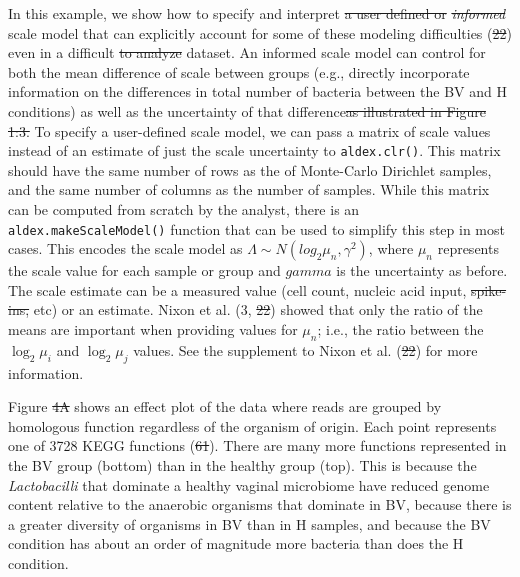 \documentclass[
]{article}
\providecommand{\DIFadd}[1]{{\protect\color{blue}\uwave{#1}}} %
\providecommand{\DIFdel}[1]{{\protect\color{red}\sout{#1}}}                      %
\providecommand{\DIFaddbegin}{} %
\providecommand{\DIFaddend}{} %
\providecommand{\DIFdelbegin}{} %
\providecommand{\DIFdelend}{} %
\newcommand{\DIFscaledelfig}{0.5}
\newlength{\DIFdelgraphicswidth} %
\newlength{\DIFdelgraphicsheight} %
\newcommand{\DIFaddincludegraphics}[2][]{{\color{blue}\fbox{\DIFOincludegraphics[#1]{#2}}}} %
\newcommand{\DIFdelincludegraphics}[2][]{%
\sbox{\DIFdelgraphicsbox}{\DIFOincludegraphics[#1]{#2}}%
\settoboxwidth{\DIFdelgraphicswidth}{\DIFdelgraphicsbox} %
\settoboxtotalheight{\DIFdelgraphicsheight}{\DIFdelgraphicsbox} %
\scalebox{\DIFscaledelfig}{%
\parbox[b]{\DIFdelgraphicswidth}{\usebox{\DIFdelgraphicsbox}\\[-\baselineskip] \rule{\DIFdelgraphicswidth}{0em}}\llap{\resizebox{\DIFdelgraphicswidth}{\DIFdelgraphicsheight}{%
\setlength{\unitlength}{\DIFdelgraphicswidth}%
\begin{picture}(1,1)%
\thicklines\linethickness{2pt} %
{\color[rgb]{1,0,0}\put(0,0){\framebox(1,1){}}}%
{\color[rgb]{1,0,0}\put(0,0){\line( 1,1){1}}}%
{\color[rgb]{1,0,0}\put(0,1){\line(1,-1){1}}}%
\end{picture}%
}\hspace*{3pt}}} %
} %
\DeclareRobustCommand{\DIFaddbegin}{\DIFOaddbegin \let\includegraphics\DIFaddincludegraphics} %
\DeclareRobustCommand{\DIFaddend}{\DIFOaddend \let\includegraphics\DIFOincludegraphics} %
\DeclareRobustCommand{\DIFdelbegin}{\DIFOdelbegin \let\includegraphics\DIFdelincludegraphics} %
\DeclareRobustCommand{\DIFdelend}{\DIFOaddend \let\includegraphics\DIFOincludegraphics} %
\begin{document}
\DIFdelend In this example, we show how to specify and interpret \DIFdelbegin \DIFdel{a user defined or
}\emph{\DIFdel{informed}} %
\DIFdelend \DIFaddbegin \DIFadd{an informed }\DIFaddend scale
model that can explicitly account for some of these modeling
difficulties (\DIFdelbegin \DIFdel{22}\DIFdelend \DIFaddbegin \DIFadd{20}\DIFaddend ) even in a difficult \DIFdelbegin \DIFdel{to analyze }\DIFdelend dataset. An informed scale model
can control for both the mean difference of scale between groups (e.g.,
directly incorporate information on the differences in total number of
bacteria between the BV and H conditions) as well as the uncertainty of
that difference\DIFdelbegin \DIFdel{as illustrated in Figure
1:3. }\DIFdelend \DIFaddbegin \DIFadd{. }\DIFaddend To specify a user-defined scale model, we can pass a
matrix of scale values instead of an estimate of just the scale
uncertainty to \texttt{aldex.clr()}. This matrix should have the same
number of rows as the of Monte-Carlo Dirichlet samples, and the same
number of columns as the number of samples. While this matrix can be
computed from scratch by the analyst, there is an
\texttt{aldex.makeScaleModel()} function that can be used to simplify
this step in most cases. This encodes the scale model as
\(\Lambda \sim N(log_2 \mu_n,
\gamma^{2})\), where \(\mu_n\) represents the scale value for each
sample or group and \DIFdelbegin \DIFdel{\(gamma\) }\DIFdelend \DIFaddbegin \DIFadd{gamma }\DIFaddend is the uncertainty as before. The scale
estimate can be a measured value (cell count, nucleic acid input, \DIFdelbegin \DIFdel{spike-ins, }\DIFdelend etc)
or an estimate. Nixon et al. (3, \DIFdelbegin \DIFdel{22}\DIFdelend \DIFaddbegin \DIFadd{20}\DIFaddend ) showed that only the ratio of the
means are important when providing values for \(\mu_n\); i.e., the ratio
between the \(\log_2 \mu_i\) and \(\log_2 \mu_j\) values. See the
supplement to Nixon et al. (\DIFdelbegin \DIFdel{22}\DIFdelend \DIFaddbegin \DIFadd{20}\DIFaddend ) for more information.

Figure \DIFdelbegin \DIFdel{4A }\DIFdelend \DIFaddbegin \DIFadd{3A }\DIFaddend shows an effect plot of the data where reads are grouped by
homologous function regardless of the organism of origin. Each point
represents one of 3728 KEGG functions (\DIFdelbegin \DIFdel{61}\DIFdelend \DIFaddbegin \DIFadd{54}\DIFaddend ). There are many more
functions represented in the BV group (bottom) than in the healthy group
(top). This is because the \textit{Lactobacilli} that dominate a healthy
vaginal microbiome have reduced genome content relative to the anaerobic
organisms that dominate in BV, because there is a greater diversity of
organisms in BV than in H samples, and because the BV condition has
about an order of magnitude more bacteria than does the H condition.
\end{document}
